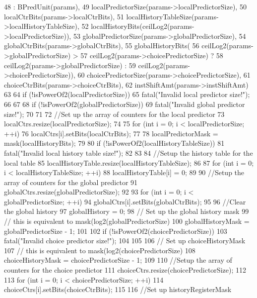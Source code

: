 \begin{DoxyCode}
48     : BPredUnit(params),
49       localPredictorSize(params->localPredictorSize),
50       localCtrBits(params->localCtrBits),
51       localHistoryTableSize(params->localHistoryTableSize),
52       localHistoryBits(ceilLog2(params->localPredictorSize)),
53       globalPredictorSize(params->globalPredictorSize),
54       globalCtrBits(params->globalCtrBits),
55       globalHistoryBits(
56           ceilLog2(params->globalPredictorSize) >
57           ceilLog2(params->choicePredictorSize) ?
58           ceilLog2(params->globalPredictorSize) :
59           ceilLog2(params->choicePredictorSize)),
60       choicePredictorSize(params->choicePredictorSize),
61       choiceCtrBits(params->choiceCtrBits),
62       instShiftAmt(params->instShiftAmt)
63 {
64     if (!isPowerOf2(localPredictorSize)) {
65         fatal("Invalid local predictor size!\n");
66     }
67 
68     if (!isPowerOf2(globalPredictorSize)) {
69         fatal("Invalid global predictor size!\n");
70     }
71 
72     //Set up the array of counters for the local predictor
73     localCtrs.resize(localPredictorSize);
74 
75     for (int i = 0; i < localPredictorSize; ++i)
76         localCtrs[i].setBits(localCtrBits);
77 
78     localPredictorMask = mask(localHistoryBits);
79 
80     if (!isPowerOf2(localHistoryTableSize)) {
81         fatal("Invalid local history table size!\n");
82     }
83 
84     //Setup the history table for the local table
85     localHistoryTable.resize(localHistoryTableSize);
86 
87     for (int i = 0; i < localHistoryTableSize; ++i)
88         localHistoryTable[i] = 0;
89 
90     //Setup the array of counters for the global predictor
91     globalCtrs.resize(globalPredictorSize);
92 
93     for (int i = 0; i < globalPredictorSize; ++i)
94         globalCtrs[i].setBits(globalCtrBits);
95 
96     //Clear the global history
97     globalHistory = 0;
98     // Set up the global history mask
99     // this is equivalent to mask(log2(globalPredictorSize)
100     globalHistoryMask = globalPredictorSize - 1;
101 
102     if (!isPowerOf2(choicePredictorSize)) {
103         fatal("Invalid choice predictor size!\n");
104     }
105 
106     // Set up choiceHistoryMask
107     // this is equivalent to mask(log2(choicePredictorSize)
108     choiceHistoryMask = choicePredictorSize - 1;
109 
110     //Setup the array of counters for the choice predictor
111     choiceCtrs.resize(choicePredictorSize);
112 
113     for (int i = 0; i < choicePredictorSize; ++i)
114         choiceCtrs[i].setBits(choiceCtrBits);
115 
116     //Set up historyRegisterMask
}
\end{DoxyCode}
